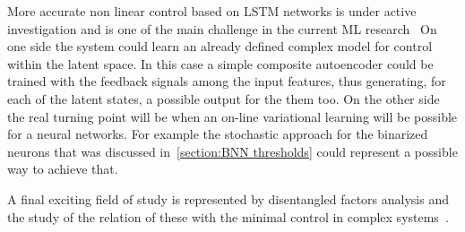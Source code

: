 More accurate non linear control based on LSTM networks is under active investigation and is one of the main challenge in the current ML research~\cite{Lesort_2018, an2019unsupervised}
On one side the system could learn an already defined complex model for control within the latent space. In this case a simple composite autoencoder could be trained with the feedback signals among the input features, thus generating, for each of the latent states, a possible output for the them too.
On the other side the real turning point will be when an on-line variational learning will be possible for a neural networks. 
For example the stochastic approach for the binarized neurons that was discussed in~\cref{section:BNN thresholds} could represent a possible way to achieve that.

A final exciting field of study is represented by disentangled factors analysis and the study of the relation of these with the minimal control in complex systems~\cite{Liu2011}.



